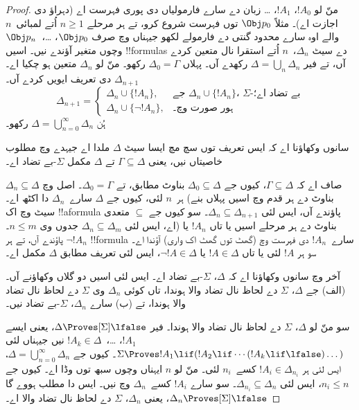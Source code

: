 \documentclass[../../../include/open-logic-section]{subfiles}
\begin{document}
\begin{proof}
منّ لو $!A_0$، $!A_1$، \dots{} زبان دے سارے فارمولیاں دی پوری فہرست اے (دہراؤ دی اجازت اے)۔ مثلاً $\Obj p_0$ توں فہرست شروع کرو، تے ہر مرحلے $n \ge 1$ اُتے لمبائی~$n$ والے اوہ سارے محدود گنتی دے فارمولے لکھو جیہناں وچ صرف $\Obj p_0$،
\dots،~$\Obj p_n$ وچوں متغیر آؤندے نیں۔ اسیں !!{formula}s دے سیٹ $\Delta_n$،~$n$ اُتے استقرا نال متعین کردے آں، تے فیر $\Delta = \bigcup_n \Delta_n$ رکھدے آں۔ پہلاں $\Delta_0 = \Gamma$ رکھو۔ منّ لو $\Delta_n$ متعین ہو چکیا اے۔ $\Delta_{n+1}$ دی تعریف ایویں کردے آں۔
\[
\Delta_{n+1} =
\begin{cases}
  \Delta_n \cup \{!A_n\}, & \text{جے $\Delta_n \cup \{ !A_n\}$،
    $\Sigma$-بے تضاد اے؛} \\
  \Delta_n \cup \{ \lnot !A_n\}, & \text{ہور صورت وچ۔}
\end{cases}
\]
ہُن $\Delta = \bigcup_{n=0}^\infty \Delta_n$ رکھو۔

سانوں وکھاؤنا اے کہ ایس تعریف توں سچ مچ ایسا سیٹ $\Delta$ ملدا اے جیہدے وچ مطلوب خاصیتاں نیں، یعنی $\Gamma \subseteq \Delta$ تے
$\Delta$ مکمل $\Sigma$-بے تضاد اے۔

صاف اے کہ $\Gamma \subseteq \Delta$، کیوں جے $\Delta_0 \subseteq
\Delta$ بناوٹ مطابق، تے $\Delta_0 = \Gamma$۔ اصل وچ $\Delta_n
\subseteq \Delta$ ہر~$n$ لئی، کیوں جے $\Delta$ سارے~$\Delta_n$ دا اکٹھ اے۔ (بناوٹ دے ہر قدم وچ اسیں پہلاں بنے سیٹ وچ اک !!a{formula} پاؤندے آں، ایس لئی $\Delta_n \subseteq
\Delta_{n+1}$۔ سو کیوں جے $\subseteq$ متعدی اے، ایس لئی $\Delta_n \subseteq
\Delta_{m}$ جدوں وی $n \le m$۔) بناوٹ دے ہر مرحلے اسیں یا تاں $!A_n$ یا $\lnot !A_n$ پاؤندے آں، تے ہر !!{formula} سارے~$!A_n$ دی فہرست وچ (گھٹ توں گھٹ اک واری) آؤندا اے۔ سو ہر $!A$ لئی یا تاں $!A
\in \Delta$ یا $\lnot !A \in \Delta$، ایس لئی تعریف مطابق $\Delta$ مکمل اے۔

آخر وچ سانوں وکھاؤنا اے کہ $\Delta$، $\Sigma$-بے تضاد اے۔ ایس لئی اسیں دو گلاں وکھاؤنے آں۔ (الف) جے $\Delta$، $\Sigma$ دے لحاظ نال تضاد والا ہوندا، تاں کوئی $\Delta_n$ وی $\Sigma$ دے لحاظ نال تضاد والا ہوندا، تے (ب) سارے $\Delta_n$،
$\Sigma$-بے تضاد نیں۔

سو منّ لو $\Delta$، $\Sigma$ دے لحاظ نال تضاد والا ہوندا۔ فیر $\Delta
\Proves[\Sigma] \lfalse$، یعنی ایسے $!A_1$، \dots،~$!A_k \in
\Delta$ نیں جیہناں لئی $\Sigma \Proves !A_1 \lif (!A_2 \lif \cdots (!A_k
\lif \lfalse)\dots)$۔ کیوں جے $\Delta = \bigcup_{n=0}^\infty \Delta_n$، ایس لئی ہر
$!A_i \in \Delta_{n_i}$ کسے~$n_i$ لئی۔ منّ لو $n$ ایہناں وچوں سبھ توں وڈا اے۔ کیوں جے $n_i \le n$، ایس لئی $\Delta_{n_i} \subseteq \Delta_n$۔ سو سارے
$!A_i$ کسے~$\Delta_n$ وچ نیں۔ ایس دا مطلب ہووے گا $\Delta_n
\Proves[\Sigma] \lfalse$، یعنی $\Delta_n$، $\Sigma$ دے لحاظ نال تضاد والا اے۔


\end{proof}
\end{document}
